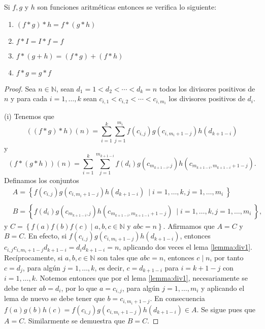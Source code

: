 \begin{proposition}
Si $f,g$ y $h$ son funciones aritméticas entonces se verifica lo siguiente:

\begin{enumerate}[label=\textnormal{(\roman*)}]
	\item $(f*g)*h=f*(g*h)$
	\item $f*I=I*f=f$
	\item $f*(g+h)=(f*g)+(f*h)$
	\item $f*g=g*f$
\end{enumerate}
\end{proposition}
\begin{proof}
Sea $n\in\mathbb{N}$, sean $d_1=1<d_2<\cdots<d_k=n$ todos los divisores positivos de $n$ y para cada $i=1,\ldots,k$ sean $c_{i,1}<c_{i,2}<\cdots<c_{i,m_i}$ los divisores positivos de $d_i$.
\bigskip

(i) Tenemos que 
\begin{equation}\label{eqn:sum1}
	((f*g)*h)(n)=\sum_{i=1}^{k} \sum_{j=1}^{m_i} f(c_{i,j})g(c_{i,m_i+1-j})h(d_{k+1-i})
\end{equation}
y 
\begin{equation}\label{eqn:sum2}
	(f*(g*h))(n)=\sum_{i=1}^{k} \sum_{j=1}^{m_{k+1-i}} f(d_i)g(c_{m_{k+1-i},j})h(c_{m_{k+1-i},m_{k+1-i}+1-j}).
\end{equation}
Definamos los conjuntos 
\begin{align*}
	& A=\left\{f(c_{i,j})g(c_{i,m_i+1-j})h(d_{k+1-i}) \: \mid i=1,\ldots,k,j=1,\ldots,m_i \: \right\} \\
	& \\
	& B=\left\{f(d_i)g(c_{m_{k+1-i},j})h(c_{m_{k+1-i},m_{k+1-i}+1-j}) \: \mid i=1,\ldots,k,j=1,\ldots,m_i \: \right\},
\end{align*}
y $C=\left\{f(a)f(b)f(c) \mid a,b,c\in\mathbb{N} \textrm{ y } a b c=n\right\}$. Afirmamos que $A=C$ y $B=C$. En efecto, si $f(c_{i,j})g(c_{i,m_i+1-j})h(d_{k+1-i})$, entonces $c_{i,j}c_{i,m_i+1-j}d_{k+1-i}=d_i d_{k+1-i}=n$, aplicando dos veces el lema \eqref{lemma:div1}. Recíprocamente, si $a,b,c\in\mathbb{N}$ son tales que $a b c = n$, entonces $c \mid n$, por tanto $c=d_j$, para algún $j=1,\ldots,k$, es decir, $c=d_{k+1-i}$ para $i=k+1-j$ con $i=1,\ldots,k$. Notemos entonces que por el lema \eqref{lemma:div1}, necesariamente se debe tener $a b=d_i$, por lo que $a=c_{i,j}$, para algún $j=1,\ldots,m_i$ y aplicando el lema de nuevo se debe tener que $b=c_{i,m_i+1-j}$. En consecuencia $f(a)g(b)h(c)=f(c_{i,j})g(c_{i,m_i+1-j})h(d_{k+1-i})\in A$. Se sigue pues que $A=C$. Similarmente se demuestra que $B=C$.
\bigskip


\end{proof}
